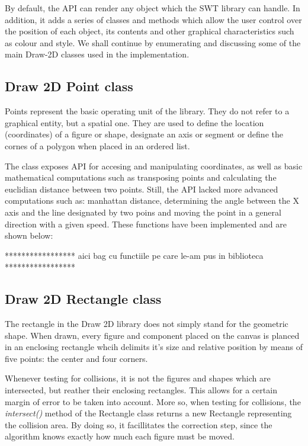 By default, the API can render any object which the SWT library can handle. In addition, it adds a series of 
classes and methods which allow the user control over the position of each object, its contents and other 
graphical characteristics such as colour and style. We shall continue by enumerating and discussing some of 
the main Draw-2D classes used in the implementation.

\subsection{Draw 2D Point class}

Points represent the basic operating unit of the library. They do not refer to a graphical entity, but a 
spatial one. They are used to define the location (coordinates) of a figure or shape, designate an axis 
or segment or define the cornes of a polygon when placed in an ordered list.

The class exposes API for accesing and manipulating coordinates, as well as basic mathematical computations 
such as transposing points and calculating the euclidian distance between two points. Still, the API lacked more 
advanced computations such as: manhattan distance, determining the angle between the X axis and the line 
designated by two poins and moving the point in a general direction with a given speed. These functions 
have been implemented and are shown below:

***************** aici bag cu functiile pe care le-am pus in biblioteca *****************

\subsection{Draw 2D Rectangle class}

The rectangle in the Draw 2D library does not simply stand for the geometric shape. When drawn, every 
figure and component placed on the canvas is planced in an enclosing rectangle whcih delimits it's size 
and relative position by means of five points: the center and four corners. 

Whenever testing for collisions, it is not the figures and shapes which are intersected, but reather their 
enclosing rectangles. This allows for a certain margin of error to be taken into account. More so, when 
testing for collisions, the \emph{intersect()} method of the Rectangle class returns a new Rectangle 
representing the collision area. By doing so, it facillitates the correction step, since the algorithm 
knows exactly how much each figure must be moved.

